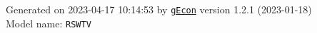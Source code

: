 \documentclass[10pt,a4paper]{article}
\numberwithin{equation}{section}
\begin{document}
\begin{landscape}
\begin{flushleft}{\large
Generated  on 2023-04-17 10:14:53 by \href{http://gecon.r-forge.r-project.org/}{\texttt{gEcon}} version 1.2.1 (2023-01-18)\\
Model name: \verb+RSWTV+
}\end{flushleft}


\end{landscape}

\end{document}
